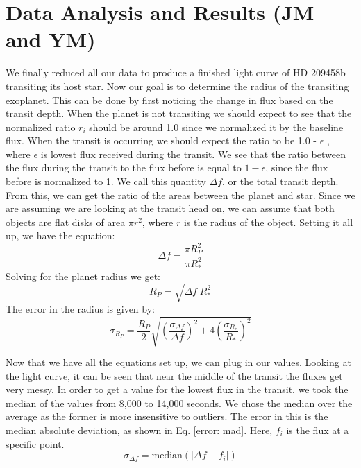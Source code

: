 \documentclass{aastex61}
\begin{document}
\section{Data Analysis and Results (JM and YM)}
We finally reduced all our data to produce a finished light curve of HD 209458b transiting its host star. Now our goal is to determine the radius of the transiting exoplanet. This can be done by first noticing the change in flux based on the transit depth. When the planet is not transiting we should expect to see that the normalized ratio $r_{i}$ should be around 1.0 since we normalized it by the baseline flux. When the transit is occurring we should expect the ratio to be 1.0 - $\epsilon$ , where $\epsilon$ is lowest flux received during the transit. We see that the ratio between the flux during the transit to the flux before is equal to $1-\epsilon$, since the flux before is normalized to 1. We call this quantity $\Delta f$, or the total transit depth. From this, we can get the ratio of the areas between the planet and star. Since we are assuming we are looking at the transit head on, we can assume that both objects are flat disks of area $\pi r^{2}$, where $r$ is the radius of the object. Setting it all up, we have the equation:
\begin{equation}
	\Delta f = \frac{\pi R_{P}^{2}}{\pi R_{*}^{2}}
\end{equation}
Solving for the planet radius we get:
\begin{equation}
	R_{P} = \sqrt{\Delta f \; R_{*}^{2}}
\end{equation}
The error in the radius is given by:
\begin{equation}
	\sigma_{R_{P}} = \frac{R_{P}}{2}\sqrt{\left( \frac{\sigma_{ \Delta f}}{\Delta f}\right)^{2}  + 4\left( \frac{\sigma_{ R_{*}}}{R_{*}}\right)^{2} } 
\end{equation}

Now that we have all the equations set up, we can plug in our values. Looking at the light curve, it can be seen that near the middle of the transit the fluxes get very messy. In order to get a value for the lowest flux in the transit, we took the median of the values from 8,000 to 14,000 seconds. We chose the median over the average as the former is more insensitive to outliers. The error in this is the median absolute deviation, as shown in Eq. \eqref{error: mad}. Here, $f_i$ is the flux at a specific point.
\begin{equation} \label{error: mad}
	\sigma_{\Delta f} = \text{median}(\lvert \Delta f - f_i \rvert)
\end{equation}
\end{document}
